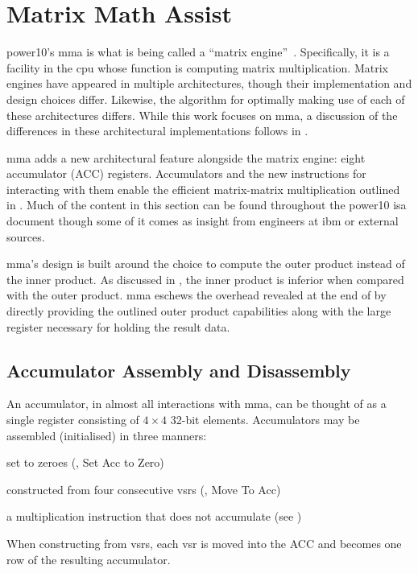 \documentclass[\main/thesis.tex]{subfiles}
\begin{document}
\chapter{Matrix Math Assist}
\label{cha:mma}

\Gls{power10}'s \gls{mma} is what is being called a ``matrix engine''~\autocite{domke2021matrix}.
Specifically, it is a facility in the \gls{cpu} whose function is computing matrix multiplication.
Matrix engines have appeared in multiple architectures, though their implementation and design choices differ.
Likewise, the algorithm for optimally making use of each of these architectures differs.
While this work focuses on \gls{mma}, a discussion of the differences in these architectural implementations follows in .

\gls{mma} adds a new architectural feature alongside the matrix engine: eight accumulator (ACC) registers.
Accumulators and the new instructions for interacting with them enable the efficient matrix-matrix multiplication outlined in .
Much of the content in this section can be found throughout the \gls{power10} \gls{isa} document though some of it comes as insight from engineers at \gls{ibm} or external sources.

\Gls{mma}'s design is built around the choice to compute the outer product instead of the inner product.
As discussed in , the inner product is inferior when compared with the outer product.
\Gls{mma} eschews the overhead revealed at the end of  by directly providing the outlined outer product capabilities along with the large register necessary for holding the result data.

\section{Accumulator Assembly and Disassembly}
\label{sec:assDis}
An accumulator, in almost all interactions with \gls{mma}, can be thought of as a single register consisting of $4 \times 4$ 32-bit elements.
Accumulators may be assembled (initialised) in three manners:
\begin{enumerate*}[itemjoin*={{ and }}, label=\textbf{(\arabic*)}, after={.}]
  \item set to zeroes (, Set Acc to Zero)
  \item constructed from four consecutive \glspl{vsr} (, Move To Acc)
  \item a multiplication instruction that does not accumulate (see )
\end{enumerate*}
When constructing from \glspl{vsr}, each \gls{vsr} is moved into the ACC and becomes one row of the resulting accumulator.\footnotemark
{}
\end{document}
